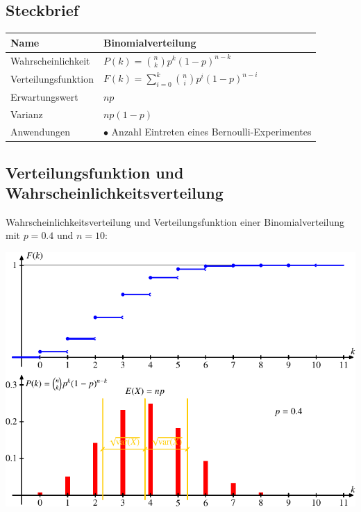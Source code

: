 \subsection{Steckbrief}
\begin{center}
\renewcommand{\arraystretch}{1.5}
\begin{tabular}{|l|l|}
\hline
Name&Binomialverteilung\\
\hline
Wahrscheinlichkeit&
\begin{minipage}{3.7in}
\vskip3pt
$\displaystyle P(k)=\binom{n}{k}p^k(1-p)^{n-k}$
\end{minipage}
\\[10pt]
Verteilungsfunktion&
$\displaystyle F(k)=\sum_{i=0}^k\binom{n}{i}p^i(1-p)^{n-i}$
\\[10pt]
Erwartungswert&$\displaystyle np$\\
Varianz&$\displaystyle np(1-p)$\\
\hline
Anwendungen&\begin{minipage}{3.7in}%
\strut
$\bullet$ Anzahl Eintreten eines Bernoulli-Experimentes
\strut
\end{minipage}\\
\hline
\end{tabular}
\end{center}

\subsection{Verteilungsfunktion und Wahrscheinlichkeitsverteilung}
Wahrscheinlichkeitsverteilung und Verteilungsfunktion einer
Binomialverteilung mit $p=0.4$ und $n=10$:
\begin{center}
\includegraphics{images/gl-3.pdf}
\end{center}


